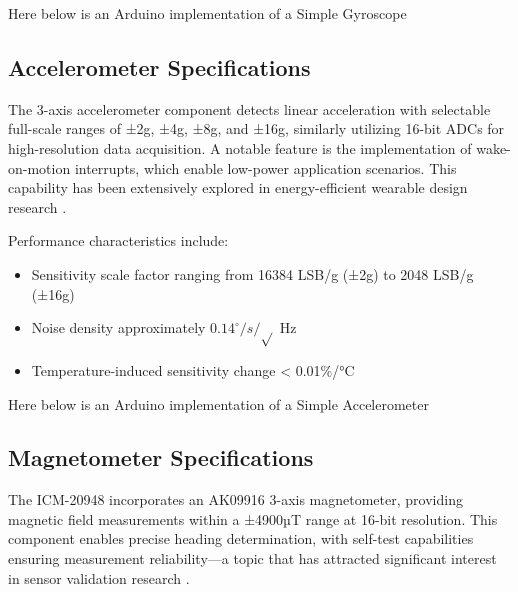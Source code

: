 Here below is an Arduino implementation of a Simple Gyroscope \cite{ArduCAM:ICM20948}

{
    \label{Gyroscope:example}
}


\subsection{Accelerometer Specifications}

The 3-axis accelerometer component detects linear acceleration with selectable full-scale ranges of ±2g, ±4g, ±8g, and ±16g, similarly utilizing 16-bit ADCs for high-resolution data acquisition. A notable feature is the implementation of wake-on-motion interrupts, which enable low-power application scenarios. This capability has been extensively explored in energy-efficient wearable design research \cite{Wen:2014,TDK:2024}.

Performance characteristics include:
\begin{itemize}
    \item Sensitivity scale factor ranging from 16384 LSB/g (±2g) to 2048 LSB/g (±16g)
    \item Noise density approximately $0.14^\circ /s/\sqrt{}$ Hz    
    \item Temperature-induced sensitivity change < 0.01\%/°C \cite{Wen:2014}
\end{itemize}


Here below is an Arduino implementation of a Simple Accelerometer \cite{ArduCAM:ICM20948}

{
    \label{Accelerometer:example}
}



\subsection{Magnetometer Specifications}

The ICM-20948 incorporates an AK09916 3-axis magnetometer, providing magnetic field measurements within a ±4900µT range at 16-bit resolution. This component enables precise heading determination, with self-test capabilities ensuring measurement reliability—a topic that has attracted significant interest in sensor validation research \cite{Wen:2014,TDK:2024}.

